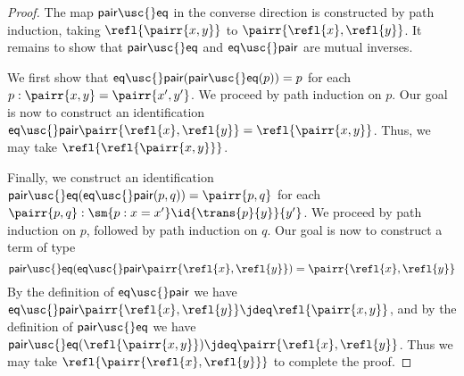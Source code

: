 \begin{proof}
The map $\mathsf{pair\usc{}eq}$ in the converse direction is constructed by path induction, taking $\refl{\pairr{x,y}}$ to $\pairr{\refl{x},\refl{y}}$.
It remains to show that $\mathsf{pair\usc{}eq}$ and $\mathsf{eq\usc{}pair}$ are mutual inverses. 

We first show that $\mathsf{eq\usc{}pair}(\mathsf{pair\usc{}eq}(p))=p$ for each $p:\pairr{x,y}=\pairr{x',y'}$. We proceed by path induction on $p$. 
Our goal is now to construct an identification $\mathsf{eq\usc{}pair}\pairr{\refl{x},\refl{y}}=\refl{\pairr{x,y}}$. 
Thus, we may take $\refl{\refl{\pairr{x,y}}}$.

Finally, we construct an identification $\mathsf{pair\usc{}eq}(\mathsf{eq\usc{}pair}(p,q))=\pairr{p,q}$ for each $\pairr{p,q}:\sm{p:x=x'}\id{\trans{p}{y}}{y'}$. We proceed by path induction on $p$, followed by path induction on $q$. Our goal is now to construct a term of type
\begin{equation*}
\mathsf{pair\usc{}eq}(\mathsf{eq\usc{}pair}\pairr{\refl{x},\refl{y}})=\pairr{\refl{x},\refl{y}}
\end{equation*}
By the definition of $\mathsf{eq\usc{}pair}$ we have $\mathsf{eq\usc{}pair}\pairr{\refl{x},\refl{y}}\jdeq \refl{\pairr{x,y}}$, and by the definition of $\mathsf{pair\usc{}eq}$ we have $\mathsf{pair\usc{}eq}(\refl{\pairr{x,y}})\jdeq\pairr{\refl{x},\refl{y}}$. Thus we may take $\refl{\pairr{\refl{x},\refl{y}}}$ to complete the proof.
\end{proof}

